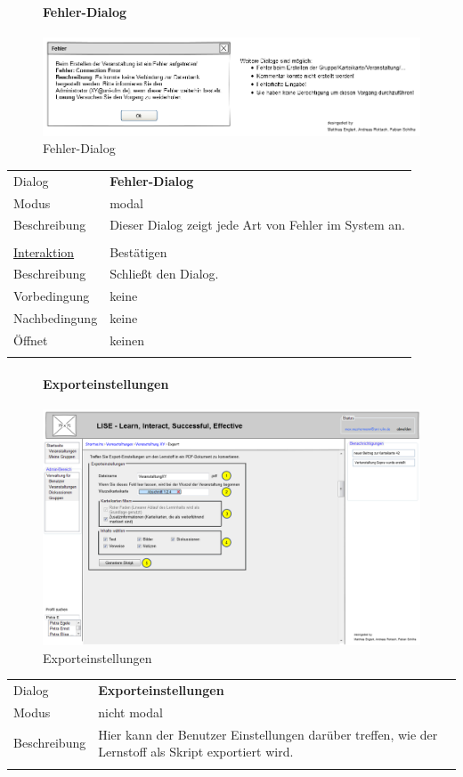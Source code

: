 \documentclass[12pt,a4paper]{article}
\begin{document}
{\begin{figure}[H]
	\paragraph{Fehler-Dialog}
	\includegraphics[width=\textwidth]{Bilder/Mockups/GUI/Fehler.png}
	\caption{Fehler-Dialog}
	\label{GuiFehlerDialog}
\end{figure}
\begin{tabular}{l p{12cm}}
	Dialog 	 & \textbf{Fehler-Dialog} \\ 
	Modus & modal\\ 
	Beschreibung   	& Dieser Dialog zeigt jede Art von Fehler im System an. \\\\
	
	\underline{Interaktion} 	 & Bestätigen\\ 
	Beschreibung   	& Schließt den Dialog.\\
	Vorbedingung	& keine \\
	Nachbedingung	& keine \\
	Öffnet			& keinen\\\\
\end{tabular}


\begin{figure}[H]
	\centering
	\paragraph{Exporteinstellungen}
	\includegraphics[width=\textwidth]{Bilder/Mockups/GUI/Exporteinstellungen.png}
	\caption{Exporteinstellungen}
	\label{GuiExporteinstellungen}
\end{figure}
\begin{tabular}{l p{12cm}}
	Dialog 	 & \textbf{Exporteinstellungen} \\ 
	Modus & nicht modal\\ 
	Beschreibung   	& Hier kann der Benutzer Einstellungen darüber treffen, wie der Lernstoff als Skript exportiert wird. \\\\
	

\end{tabular}}
\end{document}
